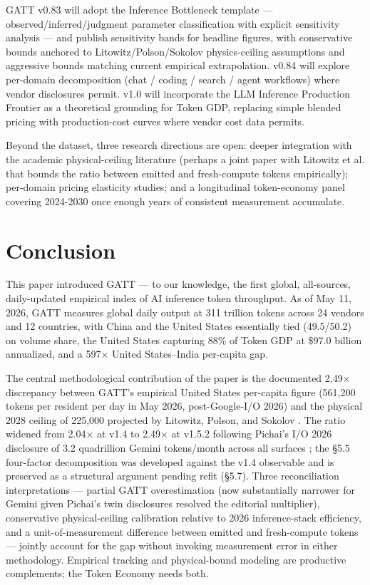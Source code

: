 \documentclass[11pt,a4paper]{article}
\begin{document}
GATT v0.83 will adopt the Inference Bottleneck \cite{inference2026bottleneck} template --- observed/inferred/judgment parameter classification with explicit sensitivity analysis --- and publish sensitivity bands for headline figures, with conservative bounds anchored to Litowitz/Polson/Sokolov \cite{litowitz2026photons} physics-ceiling assumptions and aggressive bounds matching current empirical extrapolation. v0.84 will explore per-domain decomposition (chat / coding / search / agent workflows) where vendor disclosures permit. v1.0 will incorporate the LLM Inference Production Frontier \cite{zhuang2025beyond} as a theoretical grounding for Token GDP, replacing simple blended pricing with production-cost curves where vendor cost data permits.

Beyond the dataset, three research directions are open: deeper integration with the academic physical-ceiling literature (perhaps a joint paper with Litowitz et al. that bounds the ratio between emitted and fresh-compute tokens empirically); per-domain pricing elasticity studies; and a longitudinal token-economy panel covering 2024-2030 once enough years of consistent measurement accumulate.


\section{Conclusion}

This paper introduced GATT --- to our knowledge, the first global, all-sources, daily-updated empirical index of AI inference token throughput. As of May 11, 2026, GATT measures global daily output at 311 trillion tokens across 24 vendors and 12 countries, with China and the United States essentially tied (49.5/50.2) on volume share, the United States capturing 88\% of Token GDP at \$97.0 billion annualized, and a 597× United States–India per-capita gap.

The central methodological contribution of the paper is the documented 2.49× discrepancy between GATT's empirical United States per-capita figure (561,200 tokens per resident per day in May 2026, post-Google-I/O 2026) and the physical 2028 ceiling of 225,000 projected by Litowitz, Polson, and Sokolov \cite{litowitz2026photons}. The ratio widened from 2.04× at v1.4 to 2.49× at v1.5.2 following Pichai's I/O 2026 disclosure of 3.2 quadrillion Gemini tokens/month across all surfaces \cite{pichai2026io}; the §5.5 four-factor decomposition was developed against the v1.4 observable and is preserved as a structural argument pending refit (§5.7). Three reconciliation interpretations --- partial GATT overestimation (now substantially narrower for Gemini given Pichai's twin disclosures resolved the editorial multiplier), conservative physical-ceiling calibration relative to 2026 inference-stack efficiency, and a unit-of-measurement difference between emitted and fresh-compute tokens --- jointly account for the gap without invoking measurement error in either methodology. Empirical tracking and physical-bound modeling are productive complements; the Token Economy needs both.
\end{document}
